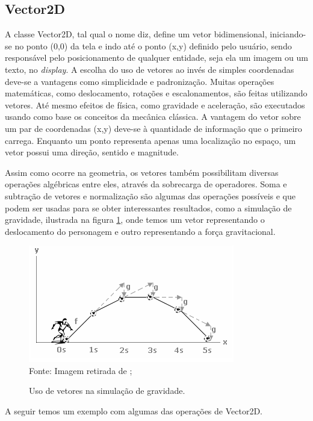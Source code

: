 \subsection{Vector2D}
%
%
A classe Vector2D, tal qual o nome diz, define um vetor bidimensional, iniciando-se no ponto (0,0) da tela e indo até o ponto (x,y) definido pelo usuário, sendo responsável pelo posicionamento de qualquer entidade, seja ela um imagem ou um texto, no \textit{display}. A escolha do uso de vetores ao invés de simples coordenadas deve-se a vantagens como simplicidade e padronização. Muitas operações matemáticas, como deslocamento, rotações e escalonamentos, são feitas utilizando vetores. Até mesmo efeitos de física, como gravidade e aceleração, são executados usando como base os conceitos da mecânica clássica. A vantagem do vetor sobre um par de coordenadas (x,y) deve-se à quantidade de informação que o primeiro carrega. Enquanto um ponto representa apenas uma localização no espaço, um vetor possui uma direção, sentido e magnitude. 
\par 
Assim como ocorre na geometria, os vetores também possibilitam diversas operações algébricas entre eles, através da sobrecarga de operadores. Soma e subtração de vetores e normalização são algumas das operações possíveis e que podem ser usadas para se obter interessantes resultados, como a simulação de gravidade, ilustrada na figura \ref{VetorGravidade}, onde temos um vetor representando o deslocamento do personagem e outro representando a força gravitacional.
%
%
%
\begin{figure}[H]
    \centering
    \caption{Uso de vetores na simulação de gravidade.}
    \label{VetorGravidade}
    \includegraphics[scale = 0.8]{Imagens/VetorGravidade.png}
    \\Fonte: Imagem retirada de \cite{PontoV};
\end{figure}
%
%
A seguir temos um exemplo com algumas das operações de Vector2D.
%

%
%
